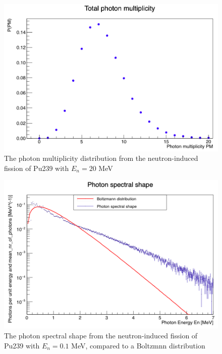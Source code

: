 \documentclass[]{article}
\begin{document}
\begin{figure} [H]
	\centering
	\includegraphics[scale=0.36]{Pu239_20_ph_mult.png}
	\caption{The photon multiplicity distribution from the neutron-induced fission of Pu239 with $E_n = 20$ MeV}
	\label{fig:Pu239_20_ph_mult}
\end{figure}

\begin{figure} [H]
	\centering
	\includegraphics[scale=0.36]{Pu239_0_1_ph_spectral_shape.png}
	\caption{The photon spectral shape from the neutron-induced fission of Pu239 with $E_n = 0.1$ MeV, compared to a Boltzmnn distribution}
	\label{fig:Pu239_0_1_ph_spectral_shape}
\end{figure}
\end{document}
